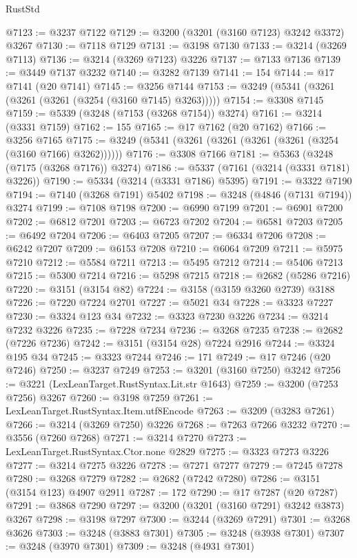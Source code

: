 \begin{lexlean}{RustStd}
\begin{coremodule}
@7123 := @3237 @7122
@7129 := @3200 (@3201 (@3160 @7123) @3242 @3372) @3267
@7130 := @7118 @7129
@7131 := @3198 @7130
@7133 := @3214 (@3269 @7113)
@7136 := @3214 (@3269 @7123) @3226
@7137 := @7133 @7136
@7139 := @3449 @7137 @3232
@7140 := @3282 @7139
@7141 := 154
@7144 := @17 @7141 (@20 @7141)
@7145 := @3256 @7144
@7153 := @3249 (@5341 (@3261 (@3261 (@3261 (@3254 (@3160 @7145) @3263)))))
@7154 := @3308 @7145
@7159 := @5339 (@3248 (@7153 (@3268 @7154)) @3274)
@7161 := @3214 (@3331 @7159)
@7162 := 155
@7165 := @17 @7162 (@20 @7162)
@7166 := @3256 @7165
@7175 := @3249 (@5341 (@3261 (@3261 (@3261 (@3261 (@3254 (@3160 @7166) @3262))))))
@7176 := @3308 @7166
@7181 := @5363 (@3248 (@7175 (@3268 @7176)) @3274)
@7186 := @5337 (@7161 (@3214 (@3331 @7181) @3226))
@7190 := @5334 (@3214 (@3331 @7186) @5395)
@7191 := @3322 @7190
@7194 := @7140 (@3268 @7191) @5402
@7198 := @3248 (@4846 (@7131 @7194)) @3274
@7199 := @7108 @7198
@7200 := @6990 @7199
@7201 := @6901 @7200
@7202 := @6812 @7201
@7203 := @6723 @7202
@7204 := @6581 @7203
@7205 := @6492 @7204
@7206 := @6403 @7205
@7207 := @6334 @7206
@7208 := @6242 @7207
@7209 := @6153 @7208
@7210 := @6064 @7209
@7211 := @5975 @7210
@7212 := @5584 @7211
@7213 := @5495 @7212
@7214 := @5406 @7213
@7215 := @5300 @7214
@7216 := @5298 @7215
@7218 := @2682 (@5286 @7216)
@7220 := @3151 (@3154 @82)
@7224 := @3158 (@3159 @3260 @2739) @3188
@7226 := @7220 @7224 @2701
@7227 := @5021 @34
@7228 := @3323 @7227
@7230 := @3324 @123 @34
@7232 := @3323 @7230 @3226
@7234 := @3214 @7232 @3226
@7235 := @7228 @7234
@7236 := @3268 @7235
@7238 := @2682 (@7226 @7236)
@7242 := @3151 (@3154 @28) @7224 @2916
@7244 := @3324 @195 @34
@7245 := @3323 @7244
@7246 := 171
@7249 := @17 @7246 (@20 @7246)
@7250 := @3237 @7249
@7253 := @3201 (@3160 @7250) @3242
@7256 := @3221 (LexLeanTarget.RustSyntax.Lit.str @1643)
@7259 := @3200 (@7253 @7256) @3267
@7260 := @3198 @7259
@7261 := LexLeanTarget.RustSyntax.Item.utf8Encode
@7263 := @3209 (@3283 @7261)
@7266 := @3214 (@3269 @7250) @3226
@7268 := @7263 @7266 @3232
@7270 := @3556 (@7260 @7268)
@7271 := @3214 @7270
@7273 := LexLeanTarget.RustSyntax.Ctor.none @2829
@7275 := @3323 @7273 @3226
@7277 := @3214 @7275 @3226
@7278 := @7271 @7277
@7279 := @7245 @7278
@7280 := @3268 @7279
@7282 := @2682 (@7242 @7280)
@7286 := @3151 (@3154 @123) @4907 @2911
@7287 := 172
@7290 := @17 @7287 (@20 @7287)
@7291 := @3868 @7290
@7297 := @3200 (@3201 (@3160 @7291) @3242 @3873) @3267
@7298 := @3198 @7297
@7300 := @3244 (@3269 @7291)
@7301 := @3268 @3626
@7303 := @3248 (@3883 @7301)
@7305 := @3248 (@3938 @7301)
@7307 := @3248 (@3970 @7301)
@7309 := @3248 (@4931 @7301)

\end{coremodule}
\end{lexlean}
